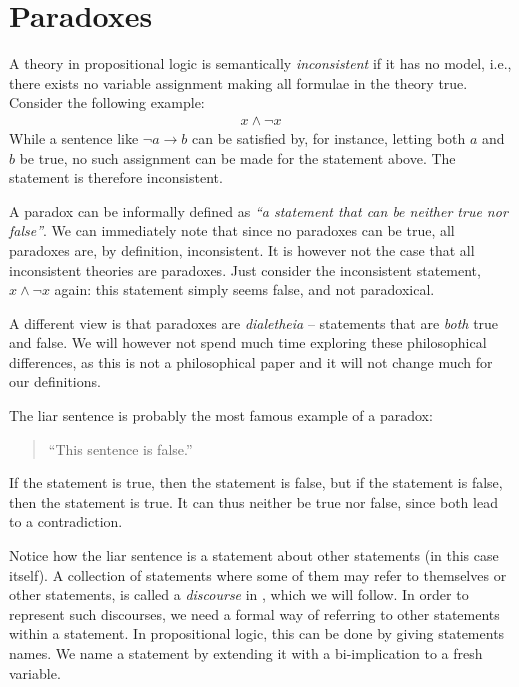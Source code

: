 \section{Paradoxes}
\label{sec:Paradoxes}
A theory in propositional logic is semantically \textit{inconsistent} if it has no model, i.e., there exists no variable assignment making all formulae in the theory true.
Consider the following example:
\begin{align}
  x \wedge \neg x
\end{align}
While a sentence like $\neg a \rightarrow b$ can be satisfied by, for instance, letting both $a$ and $b$ be true, no such assignment can be made for the statement above.
The statement is therefore inconsistent.

A paradox can be informally defined as \textit{``a statement that can be neither true nor false''}.
We can immediately note that since no paradoxes can be true, all paradoxes are, by definition, inconsistent.
It is however not the case that all inconsistent theories are paradoxes.
Just consider the inconsistent statement, $x \wedge \neg x$ again: this statement simply seems false, and not paradoxical.

A different view is that paradoxes are \textit{dialetheia} -- statements that are \textit{both} true and false\cite{sep-dialetheism}.
We will however not spend much time exploring these philosophical differences, as this is not a philosophical paper and it will not change much for our definitions.

The liar sentence is probably the most famous example of a paradox:
\begin{quote}
  ``This sentence is false.''
\end{quote}
If the statement is true, then the statement is false, but if the statement is false, then the statement is true.
It can thus neither be true nor false, since both lead to a contradiction.

Notice how the liar sentence is a statement about other statements (in this case itself).
A collection of statements where some of them may refer to themselves or other statements, is called a \textit{discourse} in \cite{synthese-pdl}, which we will follow.
In order to represent such discourses, we need a formal way of referring to other statements within a statement.
In propositional logic, this can be done by giving statements names.
We name a statement by extending it with a bi-implication to a fresh variable.

